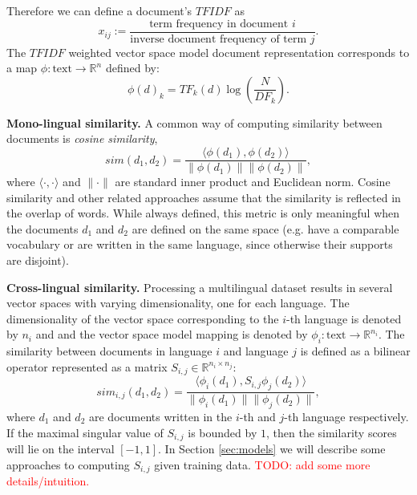\documentclass[twoside,11pt]{article}
\newcommand{\todo}[1]{\textcolor{red}{TODO: #1}}
\newcommand{\RR}{\mathbb{R}}
\begin{document}
Therefore we can define a document's $TFIDF$ as
$$ x_{ij}  := \frac{\mbox{term frequency in document } i}{\mbox{inverse document frequency of term } j}.$$
The $TFIDF$ weighted vector space model document representation corresponds to a map $\phi : \text{text} \rightarrow \RR^n$ defined by:
$$\phi(d)_k = {TF}_k(d) \log\left( \frac{N}{{DF}_k}\right).$$

\noindent\textbf {Mono-lingual similarity.}
A common way of computing similarity between documents is \emph{cosine similarity},
$$sim(d_1, d_2) = \frac{\langle \phi(d_1), \phi(d_2)\rangle}{\|\phi(d_1)\| \|\phi(d_2)\|},$$
where $\langle \cdot,\cdot \rangle$ and $\|\cdot\|$ are standard inner product and Euclidean norm. Cosine similarity and other related approaches assume that the similarity is reflected in the overlap of words. While always defined, this metric is only meaningful when the documents $d_1$ and $d_2$ are defined on the same space (e.g. have a comparable vocabulary or are written in the same language, since otherwise their supports are disjoint).

\noindent\textbf {Cross-lingual similarity.}
Processing a multilingual dataset results in several vector spaces with varying dimensionality, one for each language. The dimensionality of the vector space corresponding to the $i$-th language is denoted by $n_i$ and and the vector space model mapping is denoted by $\phi_i : \text{text} \rightarrow \RR^{n_i}$.
The similarity between documents in language $i$ and language $j$ is defined as a bilinear operator represented as a matrix $S_{i,j} \in \RR^{n_i \times n_j}$:
$$sim_{i,j}(d_1, d_2) = \frac{ \langle \phi_i (d_1), S_{i,j} \phi_j (d_2) \rangle }{\|\phi_i(d_1)\| \|\phi_j(d_2)\|},$$
where $d_1$ and $d_2$ are documents written in the $i$-th and $j$-th language respectively. If the maximal singular value of $S_{i,j}$ is bounded by $1$, then the similarity scores will lie on the interval $[-1, 1]$. In Section \ref{sec:models} we will describe some approaches to computing $S_{i,j}$ given training data. \todo{add some more details/intuition.}
\end{document}
